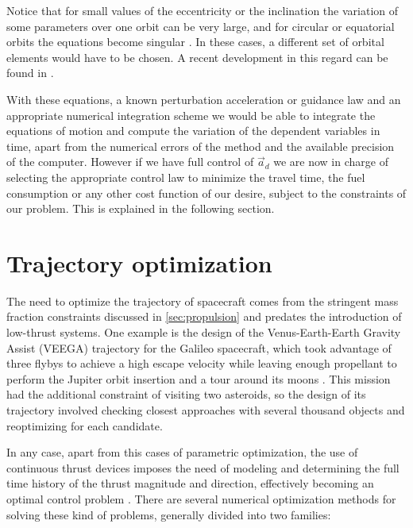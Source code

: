 Notice that for small values of the eccentricity or the inclination the variation of some parameters over one orbit can be very large, and for circular or equatorial orbits the equations become singular \cite{vallado2001fundamentals}. In these cases, a different set of orbital elements would have to be chosen. A recent development in this regard can be found in \cite{bau2013new}.

With these equations, a known perturbation acceleration or guidance law and an appropriate numerical integration scheme we would be able to integrate the equations of motion and compute the variation of the dependent variables in time, apart from the numerical errors of the method and the available precision of the computer. However if we have full control of $\vec{a}_d$ we are now in charge of selecting the appropriate control law to minimize the travel time, the fuel consumption or any other cost function of our desire, subject to the constraints of our problem. This is explained in the following section.

\section{Trajectory optimization}

The need to optimize the trajectory of spacecraft comes from the stringent mass fraction constraints discussed in \ref{sec:propulsion} and predates the introduction of low-thrust systems. One example is the design of the Venus-Earth-Earth Gravity Assist (VEEGA) trajectory for the Galileo spacecraft, which took advantage of three flybys to achieve a high escape velocity while leaving enough propellant to perform the Jupiter orbit insertion and a tour around its moons \cite{damario1989galileo}. This mission had the additional constraint of visiting two asteroids, so the design of its trajectory involved checking closest approaches with several thousand objects and reoptimizing for each candidate.

In any case, apart from this cases of parametric optimization, the use of continuous thrust devices imposes the need of modeling and determining the full time history of the thrust magnitude and direction, effectively becoming an optimal control problem \cite{conway2010spacecraft}. There are several numerical optimization methods for solving these kind of problems, generally divided into two families:


